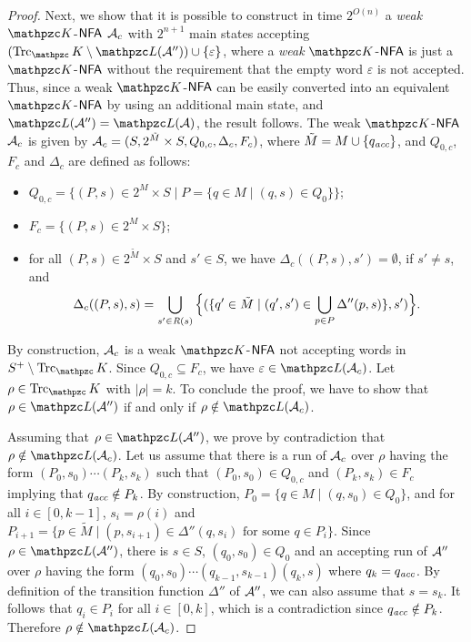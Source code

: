 \begin{proof}
Next, we show that it is possible to  construct in time $2^{O(n)}$ a \emph{weak} $\Ku$-$\text{\sffamily NFA}$ $\mathcal{A}_c$ with $2^{n+1}$ main states   accepting   $(\Trk_\Ku\setminus \Lang(\Au''))\cup \{\varepsilon\}$, where a \emph{weak} $\Ku$-$\text{\sffamily NFA}$ is just a $\Ku$-$\text{\sffamily NFA}$ without the requirement that the empty word $\varepsilon$ is not accepted. Thus, since a weak $\Ku$-$\text{\sffamily NFA}$ can be easily converted into an equivalent $\Ku$-$\text{\sffamily NFA}$ by using an additional main state, and $\Lang(\Au'')=\Lang(\Au)$, the result follows.  The weak $\Ku$-$\text{\sffamily NFA}$ $\mathcal{A}_c$ is given by
$\mathcal{A}_c=(S,2^{\tilde{M}}\times S ,Q_{0,c},\Delta_c,F_c)$, where $\tilde{M}=M\cup \{q_{\textit{acc}}\}$, and $Q_{0,c}$,  $F_c$ and $\Delta_c$ are defined as follows:
\begin{itemize}
  \item $Q_{0,c}=\{(P,s)\in 2^{M}\times S \mid P=\{q\in M\mid (q,s)\in Q_0\}\}$;
  \item $F_c=\{(P,s)\in 2^{M}\times S \}$;
  \item for all
$(P,s)\in 2^{\tilde{M}}\times S$ and $s'\in S$, we have $\Delta_c((P,s),s')=\emptyset$, if $s'\neq s$, and 
%
\[\Delta_c((P,s),s)=
 \bigcup_{s'\in \textit{R}(s)} \Big\{ (\{q'\in \tilde{M} \mid (q',s')\in \bigcup_{p\in P}\Delta''(p,s)\},s') \Big\}.
\]
%
\end{itemize}
%
By construction, $\mathcal{A}_c$ is a weak $\Ku$-$\text{\sffamily NFA}$ not accepting words in $S^{+}\setminus \Trk_\Ku$. Since $Q_{0,c}\subseteq F_c$, we have $\varepsilon\in \Lang(\Au_c)$.
Let $\rho\in \Trk_\Ku$ with $|\rho|=k$. To conclude the proof, we have to show that $\rho\in \Lang(\Au'')$ if and only if $\rho \notin \Lang(\Au_c)$.

Assuming that $\rho\in \Lang(\Au'')$, we prove by contradiction that $\rho \notin \Lang(\Au_c)$. Let us assume that there is a run of $\mathcal{A}_c$ over $\rho$ having the form $(P_0,s_0)\cdots (P_{k},s_k)$ such that
$(P_0,s_0)\in Q_{0,c}$ and $(P_k,s_k)\in F_c$ implying that $q_{\textit{acc}}\notin P_k$. By construction, $P_0 = \{q\in M\mid (q,s_0)\in Q_0\}$,   and  for all $i\in [0,k-1]$, $s_i = \rho(i)$
and $P_{i+1} = \{p\in \tilde{M} \mid (p,s_{i+1})\in \Delta''(q,s_i) \text{ for some } q\in P_i  \}$. Since $\rho\in \Lang(\Au'')$, there is $s\in S$, $(q_0,s_0)\in Q_0$ and an accepting run of
$\mathcal{A}''$ over $\rho$ having the form $(q_0,s_0)\cdots  (q_{k-1},s_{k-1}) (q_k,s)$ where $q_k = q_{\textit{acc}}$.  By definition of the transition function $\Delta ''$ of  $\mathcal{A}''$, we can also assume that
$s=s_k$. It follows that
$q_i\in P_i $ for all $i\in [0,k]$, which is a contradiction since $q_{\textit{acc}}\notin P_k$. Therefore $\rho \notin \Lang(\Au_c)$.


\end{proof}
